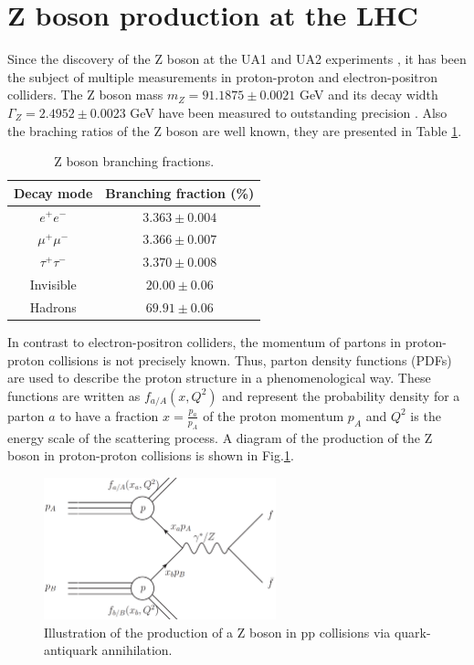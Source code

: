 \section{Z boson production at the LHC}\label{chap2sec0}
Since the discovery of the Z boson at the UA1 and UA2 experiments \cite{Arnison:1983rp,Arnison:1983mk,Banner:1983jy,Bagnaia:1983zx}, it has been the subject of multiple measurements in proton-proton and electron-positron colliders. The Z boson mass $m_Z=91.1875\pm0.0021$ GeV and its decay width $\Gamma_Z=2.4952\pm0.0023$ GeV have been measured to outstanding precision \cite{ALEPH:2005ab}. Also the braching ratios of the Z boson are well known, they are presented in Table \ref{Table0}.
\begin{table}[]
	\centering
	\begin{tabular}{cc}
		\hline
		\multicolumn{1}{|c|}{Decay mode} & \multicolumn{1}{c|}{Branching fraction (\%)} \\ \hline
		$e^+e^-$                         & $3.363\pm0.004$                              \\
		$\mu^+\mu^-$                     & $3.366\pm0.007$                              \\
		$\tau^+\tau^-$                   & $3.370\pm0.008$                              \\
		Invisible                        & $20.00\pm0.06$                               \\
		Hadrons                          & $69.91\pm0.06$                               \\ \hline
	\end{tabular}
	\caption{Z boson branching fractions.}
	\label{Table0}
\end{table}
In contrast to electron-positron colliders, the momentum of partons in proton-proton collisions is not precisely known. Thus, parton density functions (PDFs) are used to describe the proton structure in a phenomenological way. These functions are written as $f_{a/A}(x,Q^2)$ and represent the probability density for a parton $a$ to have a fraction $x=\frac{p_a}{p_A}$ of the proton momentum $p_A$ and $Q^2$ is the energy scale of the scattering process. A diagram of the production of the Z boson in proton-proton collisions is shown in Fig.\ref{Fig15}. 
\begin{figure}[h]
	\centering
	\includegraphics[width=0.6\textwidth]{figures/Fig15}
	\caption{Illustration of the production of a Z boson in pp collisions via quark-antiquark annihilation.}
	\label{Fig15}
\end{figure}
